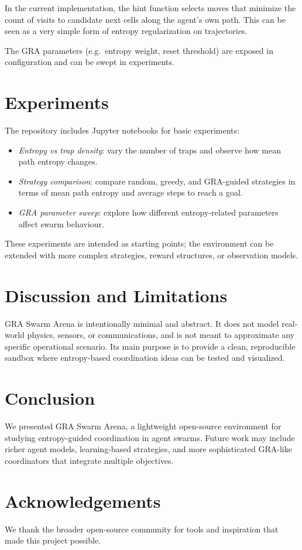 \documentclass[11pt]{article}
\begin{document}
In the current implementation, the hint function selects moves that minimize
the count of visits to candidate next cells along the agent's own path.
This can be seen as a very simple form of entropy regularization on trajectories.

The GRA parameters (e.g.\ entropy weight, reset threshold) are exposed in configuration
and can be swept in experiments.

\section{Experiments}

The repository includes Jupyter notebooks for basic experiments:
\begin{itemize}
  \item \emph{Entropy vs trap density}: vary the number of traps and observe how
        mean path entropy changes.
  \item \emph{Strategy comparison}: compare random, greedy, and GRA-guided strategies
        in terms of mean path entropy and average steps to reach a goal.
  \item \emph{GRA parameter sweep}: explore how different entropy-related parameters
        affect swarm behaviour.
\end{itemize}

These experiments are intended as starting points; the environment can be extended
with more complex strategies, reward structures, or observation models.

\section{Discussion and Limitations}

GRA Swarm Arena is intentionally minimal and abstract.
It does not model real-world physics, sensors, or communications, and is not meant
to approximate any specific operational scenario.
Its main purpose is to provide a clean, reproducible sandbox where entropy-based
coordination ideas can be tested and visualized.

\section{Conclusion}

We presented GRA Swarm Arena, a lightweight open-source environment for studying
entropy-guided coordination in agent swarms.
Future work may include richer agent models, learning-based strategies, and more
sophisticated GRA-like coordinators that integrate multiple objectives.

\section*{Acknowledgements}

We thank the broader open-source community for tools and inspiration that made
this project possible.



\end{document}
